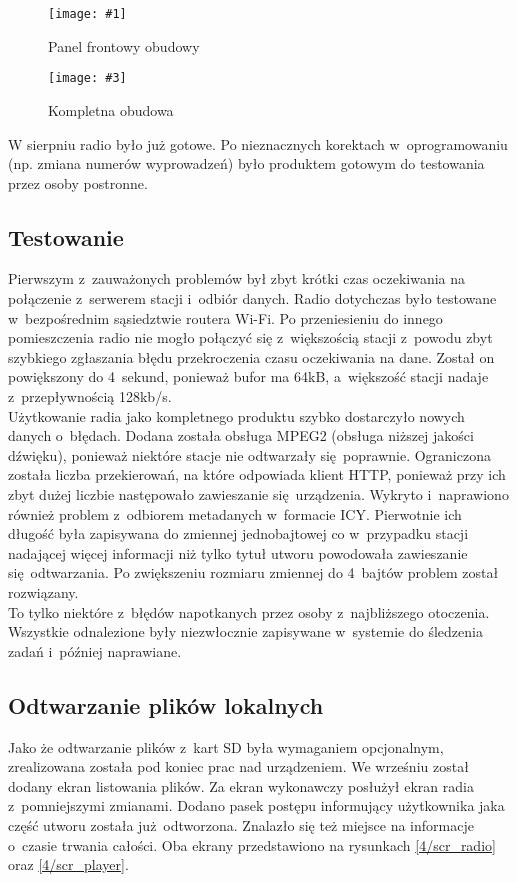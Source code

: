 \documentclass[polish]{aghengthesis}
\newcommand{\imgintss}[5]{
	\begin{figure}[{#5}]
		\centering
		\begin{minipage}{.45\textwidth}
			\centering
			\texttt{[image: \#1]}
			\caption{#2}
			\label{#1}
		\end{minipage}%
		\hfill
		\begin{minipage}{.45\textwidth}
			\centering
			\texttt{[image: \#3]}
			\caption{#4}
			\label{#3}
		\end{minipage}
	\end{figure}
}
\newcommand{\imghss}[4]{\imgintss{#1}{#2}{#3}{#4}{H}}
\begin{document}
			\imghss{4/case1}{Panel frontowy obudowy}{4/case2}{Kompletna obudowa}
			
			W sierpniu radio było już gotowe. Po nieznacznych korektach w~oprogramowaniu (np. zmiana numerów wyprowadzeń) było produktem gotowym do testowania przez osoby postronne.

		\subsection{Testowanie}
			Pierwszym z~zauważonych problemów był zbyt krótki czas oczekiwania na połączenie z~serwerem stacji i~odbiór danych. Radio dotychczas było testowane w~bezpośrednim sąsiedztwie routera Wi-Fi. Po przeniesieniu do innego pomieszczenia radio nie mogło połączyć się z~większością stacji z~powodu zbyt szybkiego zgłaszania błędu przekroczenia czasu oczekiwania na dane. Został on powiększony do 4~sekund, ponieważ bufor ma 64kB, a~większość stacji nadaje z~przepływnością 128kb/s.
			$ $\\
			
			Użytkowanie radia jako kompletnego produktu szybko dostarczyło nowych danych o~błędach. Dodana została obsługa MPEG2 (obsługa niższej jakości dźwięku), ponieważ niektóre stacje nie odtwarzały się poprawnie. Ograniczona została liczba przekierowań, na które odpowiada klient HTTP, ponieważ przy ich zbyt dużej liczbie następowało zawieszanie się urządzenia.
			Wykryto i~naprawiono również problem z~odbiorem metadanych w~formacie ICY. Pierwotnie ich długość była zapisywana do zmiennej jednobajtowej co w~przypadku stacji nadającej więcej informacji niż tylko tytuł utworu powodowała zawieszanie się odtwarzania. Po zwiększeniu rozmiaru zmiennej do 4~bajtów problem został rozwiązany.
			$ $\\
			
			To tylko niektóre z~błędów napotkanych przez osoby z~najbliższego otoczenia. Wszystkie odnalezione były niezwłocznie zapisywane w~systemie do śledzenia zadań i~później naprawiane.
			
		\subsection{Odtwarzanie plików lokalnych}
			Jako że odtwarzanie plików z~kart SD była wymaganiem opcjonalnym, zrealizowana została pod koniec prac nad urządzeniem. We wrześniu został dodany ekran listowania plików. Za ekran wykonawczy posłużył ekran radia z~pomniejszymi zmianami. Dodano pasek postępu informujący użytkownika jaka część utworu została już odtworzona. Znalazło się też miejsce na informacje o~czasie trwania całości. Oba ekrany przedstawiono na rysunkach \ref{4/scr_radio} oraz \ref{4/scr_player}.
			
\end{document}
